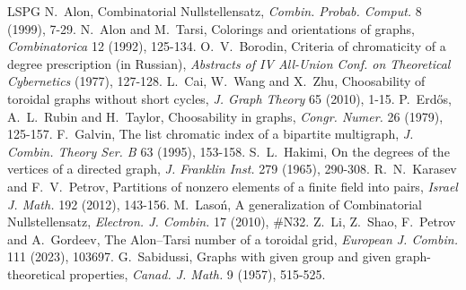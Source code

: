 \documentclass[11pt,oneside,openany]{book}
\newcounter{res}[chapter]
\begin{document}
\begin{thebibliography}{LSPG}
 N.~Alon, Combinatorial Nullstellensatz, \emph{Combin. Probab. Comput.} 8 (1999), 7-29.
 N.~Alon and M.~Tarsi, Colorings and orientations of graphs, \emph{Combinatorica} 12 (1992), 125-134.
 O.~V.~Borodin, Criteria of chromaticity of a degree prescription (in Russian), \emph{Abstracts of IV
All-Union Conf. on Theoretical Cybernetics} (1977), 127-128.
 L.~Cai, W.~Wang and X.~Zhu, Choosability of toroidal graphs without short cycles, \emph{J. Graph
Theory} 65 (2010), 1-15.
 P.~Erd\H{o}s, A.~L.~Rubin and H.~Taylor, Choosability in graphs, \emph{Congr. Numer.} 26 (1979),
125-157.
 F.~Galvin, The list chromatic index of a bipartite multigraph, \emph{J. Combin. Theory Ser. B} 63
(1995), 153-158.
 S.~L.~Hakimi, On the degrees of the vertices of a directed graph, \emph{J. Franklin Inst.} 279 (1965),
290-308.
 R.~N.~Karasev and F.~V.~Petrov, Partitions of nonzero elements of a finite field into pairs,
\emph{Israel J. Math.} 192 (2012), 143-156.
 M.~Laso\'n, A generalization of Combinatorial Nullstellensatz, \emph{Electron. J. Combin.} 17
(2010), \#N32.
 Z.~Li, Z.~Shao, F.~Petrov and A.~Gordeev, The Alon--Tarsi number of a toroidal grid,
\emph{European J. Combin.} 111 (2023), 103697.
 G.~Sabidussi, Graphs with given group and given graph-theoretical properties, \emph{Canad. J. Math.}
9 (1957), 515-525.
\end{thebibliography}
\end{document}
